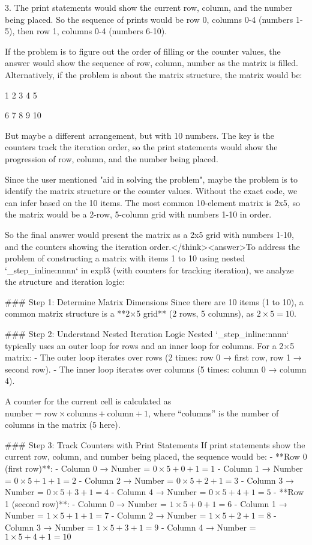 3. The print statements would show the current row, column, and the number being placed. So the sequence of prints would be row 0, columns 0-4 (numbers 1-5), then row 1, columns 0-4 (numbers 6-10).

If the problem is to figure out the order of filling or the counter values, the answer would show the sequence of row, column, number as the matrix is filled. Alternatively, if the problem is about the matrix structure, the matrix would be:

1 2 3 4 5

6 7 8 9 10

But maybe a different arrangement, but with 10 numbers. The key is the counters track the iteration order, so the print statements would show the progression of row, column, and the number being placed.

Since the user mentioned "aid in solving the problem", maybe the problem is to identify the matrix structure or the counter values. Without the exact code, we can infer based on the 10 items. The most common 10-element matrix is 2x5, so the matrix would be a 2-row, 5-column grid with numbers 1-10 in order.

So the final answer would present the matrix as a 2x5 grid with numbers 1-10, and the counters showing the iteration order.</think><answer>To address the problem of constructing a matrix with items 1 to 10 using nested `\int_step_inline:nnnn` in expl3 (with counters for tracking iteration), we analyze the structure and iteration logic:  


### Step 1: Determine Matrix Dimensions  
Since there are 10 items (1 to 10), a common matrix structure is a **2×5 grid** (2 rows, 5 columns), as \( 2 \times 5 = 10 \).  


### Step 2: Understand Nested Iteration Logic  
Nested `\int_step_inline:nnnn` typically uses an outer loop for rows and an inner loop for columns. For a 2×5 matrix:  
- The outer loop iterates over rows (2 times: row 0 → first row, row 1 → second row).  
- The inner loop iterates over columns (5 times: column 0 → column 4).  

A counter for the current cell is calculated as \( \text{number} = \text{row} \times \text{columns} + \text{column} + 1 \), where “columns” is the number of columns in the matrix (5 here).  


### Step 3: Track Counters with Print Statements  
If print statements show the current row, column, and number being placed, the sequence would be:  
- **Row 0 (first row)**:  
  - Column 0 → Number = \( 0 \times 5 + 0 + 1 = 1 \)  
  - Column 1 → Number = \( 0 \times 5 + 1 + 1 = 2 \)  
  - Column 2 → Number = \( 0 \times 5 + 2 + 1 = 3 \)  
  - Column 3 → Number = \( 0 \times 5 + 3 + 1 = 4 \)  
  - Column 4 → Number = \( 0 \times 5 + 4 + 1 = 5 \)  
- **Row 1 (second row)**:  
  - Column 0 → Number = \( 1 \times 5 + 0 + 1 = 6 \)  
  - Column 1 → Number = \( 1 \times 5 + 1 + 1 = 7 \)  
  - Column 2 → Number = \( 1 \times 5 + 2 + 1 = 8 \)  
  - Column 3 → Number = \( 1 \times 5 + 3 + 1 = 9 \)  
  - Column 4 → Number = \( 1 \times 5 + 4 + 1 = 10 \)  


